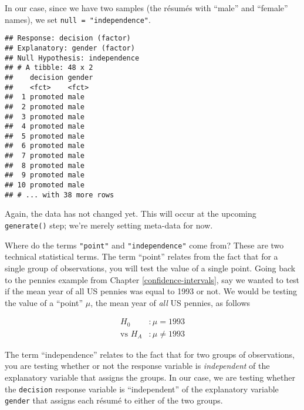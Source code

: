 \documentclass[
]{book}
\newenvironment{Shaded}{\begin{snugshade}}{\end{snugshade}}
\newcommand{\DataTypeTok}[1]{\textcolor[rgb]{0.13,0.29,0.53}{#1}}
\newcommand{\KeywordTok}[1]{\textcolor[rgb]{0.13,0.29,0.53}{\textbf{#1}}}
\newcommand{\NormalTok}[1]{#1}
\newcommand{\OperatorTok}[1]{\textcolor[rgb]{0.81,0.36,0.00}{\textbf{#1}}}
\newcommand{\StringTok}[1]{\textcolor[rgb]{0.31,0.60,0.02}{#1}}
\begin{document}
In our case, since we have two samples (the résumés with ``male'' and ``female'' names), we set \texttt{null\ =\ "independence"}.

\begin{Shaded}
\end{Shaded}

\begin{verbatim}
## Response: decision (factor)
## Explanatory: gender (factor)
## Null Hypothesis: independence
## # A tibble: 48 x 2
##    decision gender
##    <fct>    <fct> 
##  1 promoted male  
##  2 promoted male  
##  3 promoted male  
##  4 promoted male  
##  5 promoted male  
##  6 promoted male  
##  7 promoted male  
##  8 promoted male  
##  9 promoted male  
## 10 promoted male  
## # ... with 38 more rows
\end{verbatim}

Again, the data has not changed yet. This will occur at the upcoming \texttt{generate()} step; we're merely setting meta-data for now.

Where do the terms \texttt{"point"} and \texttt{"independence"} come from? These are two technical statistical terms. The term ``point'' relates from the fact that for a single group of observations, you will test the value of a single point. Going back to the pennies example from Chapter \ref{confidence-intervals}, say we wanted to test if the mean year of all US pennies was equal to 1993 or not. We would be testing the value of a ``point'' \(\mu\), the mean year of \emph{all} US pennies, as follows

\[
\begin{aligned}
H_0 &: \mu = 1993\\
\text{vs } H_A&: \mu \neq 1993
\end{aligned}
\]

The term ``independence'' relates to the fact that for two groups of observations, you are testing whether or not the response variable is \emph{independent} of the explanatory variable that assigns the groups. In our case, we are testing whether the \texttt{decision} response variable is ``independent'' of the explanatory variable \texttt{gender} that assigns each résumé to either of the two groups.
\end{document}
